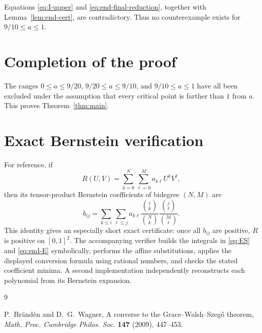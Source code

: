 \documentclass[11pt]{article}
\theoremstyle{remark}
\begin{document}
Equations \eqref{eq:I-upper} and \eqref{eq:end-final-reduction}, together with
Lemma~\ref{lem:end-cert}, are contradictory.  Thus no counterexample exists
for $9/10\le a\le1$.

\section{Completion of the proof}

The ranges $0\le a\le9/20$, $9/20\le a\le9/10$, and
$9/10\le a\le1$ have all been excluded under the assumption that every
critical point is farther than $1$ from $a$.  This proves
Theorem~\ref{thm:main}.

\appendix
\section{Exact Bernstein verification}

For reference, if
\[
 R(U,V)=\sum_{k=0}^{N}\sum_{\ell=0}^{M}a_{k\ell}U^kV^\ell,
\]
then its tensor-product Bernstein coefficients of bidegree $(N,M)$ are
\[
 b_{ij}=
 \sum_{k\le i}\sum_{\ell\le j}
 a_{k\ell}
 \frac{\binom{i}{k}}{\binom{N}{k}}
 \frac{\binom{j}{\ell}}{\binom{M}{\ell}}.
\]
This identity gives an especially short exact certificate: once all $b_{ij}$
are positive, $R$ is positive on $[0,1]^2$.  The accompanying verifier builds
the integrals in \eqref{eq:ES} and \eqref{eq:end-E} symbolically, performs the
affine substitutions, applies the displayed conversion formula using rational
numbers, and checks the stated coefficient minima.  A second implementation
independently reconstructs each polynomial from its Bernstein expansion.

\begin{thebibliography}{9}

P.~Br\"and\'en and D.~G.~Wagner,
\newblock A converse to the Grace--Walsh--Szeg\H{o} theorem,
\newblock \emph{Math. Proc. Cambridge Philos. Soc.} \textbf{147} (2009),
447--453.

\end{thebibliography}
\end{document}
